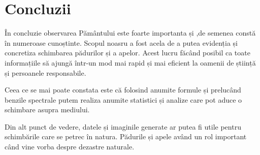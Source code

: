 \documentclass[12pt,a4paper]{article}
\theoremstyle{definition}
\theoremstyle{remark}
\begin{document}
\newpage
\section*{{\bf Concluzii}}
În concluzie observarea Pământului este foarte importanta și ,de semenea constă în numeroase cunoștinte. Scopul noasru a fost acela de a putea evidenția și concretiza schimbarea pădurilor și a apelor. Acest lucru făcând posibil ca toate informațiile să ajungă într-un mod mai rapid și mai eficient la oamenii de știință și persoanele responsabile.

Ceea ce se mai poate constata este că folosind anumite formule și prelucând benzile spectrale putem realiza anumite statistici și analize care pot aduce o schimbare asupra mediului.

Din alt punct de vedere, datele și imaginile generate ar putea fi utile pentru schimbările care se petrec în natura. Pădurile și apele având un rol important când vine vorba despre dezastre naturale.

\markright{}
\setcounter{section}{1}
\end{document}
